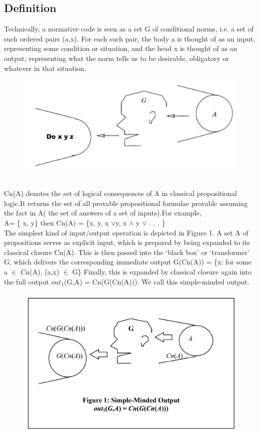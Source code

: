 \documentclass{article}
\begin{document}
 \subsection{Definition}
   Technically, a normative code is seen as a set G of conditional norms, i.e. a set of such ordered pairs (a,x). For each such pair, the body a is thought of as an input, representing some condition or situation, and the head x is thought of as an output, representing what the norm tells us to be desirable, obligatory or whatever in that situation.
\begin{figure}[hb]
\centering
\includegraphics[scale=0.45]{input_output.png}
\label{fig_framework}
\end{figure}\\
Cn(A) denotes the set of logical consequences of A in classical propositional
logic.It returns the set of all provable propositional formulae provable assuming the fact in A( the set of answers of a set of inputs).For example,\\
A= \{ x, y\} then Cn(A) = \{x, y, x $\vee $y, x $\wedge$ y $\vee$ . . . \}\\
The simplest kind of input/output operation is depicted in Figure 1. A
set A of propositions serves as explicit input, which is prepared by being expanded to its classical closure Cn(A). This is then passed into the ‘black box’ or ‘transformer’ G, which delivers the corresponding immediate output G(Cn(A)) = \{x: for some a $\in$ Cn(A), (a,x) $\in$ G\} Finally, this is expanded by classical closure again into the full output $out_{1}$(G,A) = Cn(G(Cn(A))). We call this simple-minded output.\\
\newpage
\begin{figure}[hb]
\centering
\includegraphics[scale=0.4]{simple_minded.png}

\label{fig_framework}
\end{figure}
\end{document}
